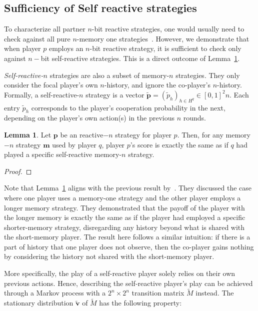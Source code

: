 \documentclass{article}
\theoremstyle{definition}
\newtheorem{lemma}[theorem]{Lemma}
\begin{document}
\subsection{Sufficiency of Self reactive strategies}

To characterize all partner $n$-bit reactive strategies, one would usually need
to check against all pure $n$-memory one strategies~\cite{mcavoy:PRSA:2019}.
However, we demonstrate that when player $p$ employs an $n$-bit reactive
strategy, it is sufficient to check only against $n-$bit self-reactive
strategies. This is a direct outcome of Lemma~\ref{lemma:self_reactive_sufficiency}.

{\it Self-reactive-$n$} strategies are also a subset of memory-$n$ strategies.
They only consider the focal player's own $n$-history, and ignore the co-player's
$n$-history. Formally, a self-reactive-$n$ strategy is a vector
$\mathbf{\tilde{p}} = (\tilde{p}_h)_{h \in H^q} \in [0, 1] ^ 2n$. Each entry
$\tilde{p}_h$ corresponds to the player's cooperation probability in the next,
depending on the player's own action(s) in the previous $n$ rounds.

\begin{lemma}\label{lemma:self_reactive_sufficiency}
  Let $\mathbf{p}$ be an reactive$-n$ strategy for player $p$. Then, for any
  memory$-n$ strategy $\mathbf{m}$ used by player $q$, player $p$'s score is
  exactly the same as if $q$ had played a specific self-reactive memory-$n$
  strategy.
\end{lemma}

\begin{proof}
\end{proof}

Note that Lemma~\ref{lemma:self_reactive_sufficiency} aligns with the previous
result by~\cite{press:PNAS:2012}. They discussed the case where one player uses
a memory-one strategy and the other player employs a longer memory strategy.
They demonstrated that the payoff of the player with the longer memory is
exactly the same as if the player had employed a specific shorter-memory
strategy, disregarding any history beyond what is shared with the short-memory
player. The result here follows a similar intuition: if there is a part of
history that one player does not observe, then the co-player gains nothing by
considering the history not shared with the short-memory player.

More specifically, the play of a self-reactive player solely relies on their own
previous actions. Hence, describing the self-reactive player's play can be
achieved through a Markov process with a $2^{n}\!\times\!2^{n}$ transition
matrix $\tilde{M}$ instead. The stationary distribution $\mathbf{\tilde{v}}$ of
$\tilde{M}$ has the following property:
\end{document}
